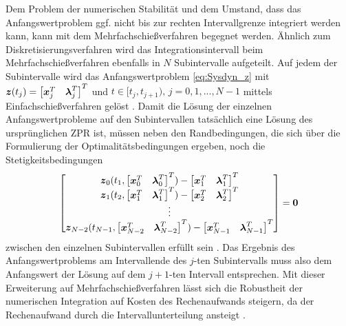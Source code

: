Dem Problem der numerischen Stabilität und dem Umstand, dass das Anfangswertproblem ggf. nicht bis zur rechten Intervallgrenze integriert werden kann, kann mit dem Mehrfachschießverfahren begegnet werden. Ähnlich zum Diskretisierungsverfahren wird das Integrationsintervall beim Mehrfachschießverfahren ebenfalls in $N$ Subintervalle aufgeteilt. Auf jedem der Subintervalle wird das Anfangswertproblem \eqref{eq:Sysdyn_z} mit $\boldsymbol{z}(t_j) = \begin{bmatrix}\boldsymbol{x}_j^T & \boldsymbol{\lambda}_j^T\end{bmatrix}^T$ und $t\in[t_j, t_{j+1}),\,j = 0,1,...,N-1$ mittels Einfachschießverfahren gelöst \cite{Gerdts.2010}. Damit die Lösung der einzelnen Anfangswertprobleme auf den Subintervallen tatsächlich eine Lösung des ursprünglichen \gls{ZPR} ist, müssen neben den Randbedingungen, die sich über die Formulierung der Optimalitätsbedingungen ergeben, noch die Stetigkeitsbedingungen \begin{equation*}
	\begin{bmatrix}
	\boldsymbol{z}_0(t_1,\begin{bmatrix}\boldsymbol{x}_0^T & \boldsymbol{\lambda}_0^T\end{bmatrix}^T) - \begin{bmatrix}\boldsymbol{x}_1^T & \boldsymbol{\lambda}_1^T\end{bmatrix}^T \\
	\boldsymbol{z}_1(t_2,\begin{bmatrix}\boldsymbol{x}_1^T & \boldsymbol{\lambda}_1^T\end{bmatrix}^T) - \begin{bmatrix}\boldsymbol{x}_2^T & \boldsymbol{\lambda}_2^T\end{bmatrix}^T \\
	\vdots \\
	\boldsymbol{z}_{N-2}(t_{N-1},\begin{bmatrix}\boldsymbol{x}_{N-2}^T & \boldsymbol{\lambda}_{N-2}^T\end{bmatrix}^T) - \begin{bmatrix}\boldsymbol{x}_{N-1}^T & \boldsymbol{\lambda}_{N-1}^T\end{bmatrix}^T
	\end{bmatrix} = \boldsymbol{0}
\end{equation*}
zwischen den einzelnen Subintervallen erfüllt sein \cite{Gerdts.2010}. Das Ergebnis des Anfangswertproblems am Intervallende des $j$-ten Subintervalls muss also dem Anfangswert der Lösung auf dem $j+1$-ten Intervall entsprechen. Mit dieser Erweiterung auf Mehrfachschießverfahren lässt sich die Robustheit der numerischen Integration auf Kosten des Rechenaufwands steigern, da der Rechenaufwand durch die Intervallunterteilung ansteigt \cite{Betts.1998}.
